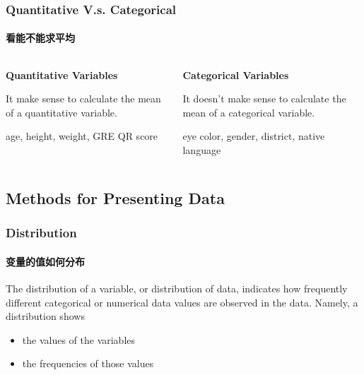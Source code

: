 \documentclass[
	11pt, %
]{beamer}
\begin{document}

\begin{frame}
	\frametitle{Quantitative V.s. Categorical }
	\framesubtitle{看能不能求平均}
	\begin{columns}[t] 
		\begin{column}{0.5\textwidth} %
		\textbf{Quantitative Variables}\\
		 \begin{definition}
		 	It make sense to calculate the mean of a quantitative variable.
		 \end{definition}
		 \begin{example}
		 	age, height, weight, GRE QR score
		 \end{example}
		\end{column}

		\begin{column}{0.5\textwidth} %
				\textbf{Categorical Variables}\\
		 \begin{definition}
		 	It doesn't make sense to calculate the mean of a categorical variable.
		 \end{definition}
		 \begin{example}
		  eye color, gender, district, native language
		 \end{example}
    \end{column}
	\end{columns}
\end{frame}



\subsection{Methods for Presenting Data}


\begin{frame}
	\frametitle{Distribution }
	\framesubtitle{变量的值如何分布}
	\begin{definition}
		The distribution of a variable, or distribution of data, indicates how
frequently different categorical or numerical data values are observed in the
data. Namely, a distribution shows
\begin{itemize}
	\item the values of the variables
	\item the frequencies of those values
\end{itemize}
	\end{definition}
\end{frame}
\end{document}
